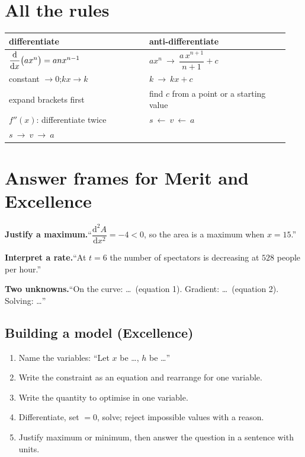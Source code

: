 \documentclass[11pt]{article}
\begin{document}
\section{All the rules}\label{rules}
\begin{tabular}{@{}p{0.47\linewidth}p{0.47\linewidth}@{}}
\toprule
differentiate & anti-differentiate\\
\midrule
$\dfrac{\mathrm{d}}{\mathrm{d}x}\bigl(ax^{n}\bigr)=anx^{n-1}$ & $ax^{n}\ \to\ \dfrac{a\,x^{n+1}}{n+1}+c$\\[2mm]
constant $\to0$;\quad $kx\to k$ & $k\ \to\ kx+c$\\[1mm]
expand brackets first & find $c$ from a point or a starting value\\[1mm]
$f''(x)$: differentiate twice & $s\ \xleftarrow{\ \ }\ v\ \xleftarrow{\ \ }\ a$\\
$s\ \to\ v\ \to\ a$ & \\
\bottomrule
\end{tabular}

\section{Answer frames for Merit and Excellence}\label{frames}
\begin{plainbox}
\textbf{Justify a maximum.}\enspace ``$\dfrac{\mathrm{d}^{2}A}{\mathrm{d}x^{2}}=-4<0$, so the area is a maximum when $x=15$.''

\smallskip
\textbf{Interpret a rate.}\enspace ``At $t=6$ the number of spectators is decreasing at $528$ people per hour.''

\smallskip
\textbf{Two unknowns.}\enspace ``On the curve: \dots\ (equation 1). Gradient: \dots\ (equation 2). Solving: \dots''
\end{plainbox}

\subsection{Building a model (Excellence)}
\begin{enumerate}[leftmargin=7mm, itemsep=1pt]
\item Name the variables: ``Let $x$ be \dots, $h$ be \dots''
\item Write the constraint as an equation and rearrange for one variable.
\item Write the quantity to optimise in one variable.
\item Differentiate, set $=0$, solve; reject impossible values with a reason.
\item Justify maximum or minimum, then answer the question in a sentence with units.
\end{enumerate}
\end{document}
